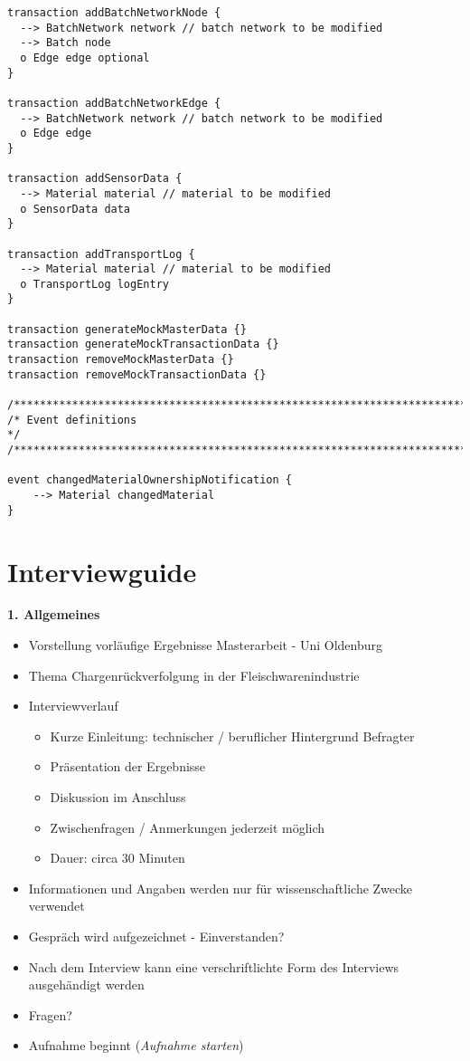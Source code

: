 \begin{lstlisting}[]
transaction addBatchNetworkNode {
  --> BatchNetwork network // batch network to be modified
  --> Batch node
  o Edge edge optional
}

transaction addBatchNetworkEdge {
  --> BatchNetwork network // batch network to be modified
  o Edge edge
}

transaction addSensorData {
  --> Material material // material to be modified
  o SensorData data
}

transaction addTransportLog {
  --> Material material // material to be modified
  o TransportLog logEntry
}

transaction generateMockMasterData {}
transaction generateMockTransactionData {}
transaction removeMockMasterData {}
transaction removeMockTransactionData {}

/*****************************************************************************/
/* Event definitions                                                         */
/*****************************************************************************/

event changedMaterialOwnershipNotification {
    --> Material changedMaterial
}
\end{lstlisting}

\newpage
\section{Interviewguide}\label{sec:interview-guide}
\footnotesize
\textbf{1. Allgemeines}
\begin{itemize}
  \item Vorstellung vorläufige Ergebnisse Masterarbeit - Uni Oldenburg
  \item Thema \glqq Chargenrückverfolgung in der Fleischwarenindustrie\grqq
  \item Interviewverlauf
  \begin{itemize}[nosep]
    \item Kurze Einleitung: technischer / beruflicher Hintergrund Befragter
    \item Präsentation der Ergebnisse
    \item Diskussion im Anschluss
    \item Zwischenfragen / Anmerkungen jederzeit möglich
    \item Dauer: circa 30 Minuten
  \end{itemize}
  \item Informationen und Angaben werden nur für wissenschaftliche Zwecke verwendet
  \item Gespräch wird aufgezeichnet - Einverstanden?
  \item Nach dem Interview kann eine verschriftlichte Form des Interviews ausgehändigt werden
  \item Fragen?
  \item Aufnahme beginnt (\textit{Aufnahme starten})
\end{itemize}

